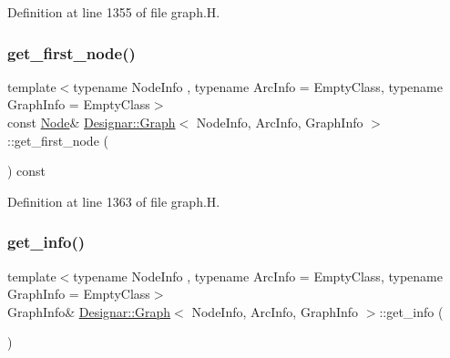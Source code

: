 Definition at line 1355 of file graph.\+H.

\mbox{\label{class_designar_1_1_graph_a2c27cdec559e9773deebec6f1af25a99}} 
\subsubsection{\texorpdfstring{get\+\_\+first\+\_\+node()}{get\_first\_node()}\hspace{0.1cm}{\footnotesize\ttfamily [2/2]}}
{\footnotesize\ttfamily template$<$typename Node\+Info , typename Arc\+Info  = Empty\+Class, typename Graph\+Info  = Empty\+Class$>$ \\
const \hyperlink{class_designar_1_1_graph_a5dfc7dba9d092ac489c72e40390c37d0}{Node}\& \hyperlink{class_designar_1_1_graph}{Designar\+::\+Graph}$<$ Node\+Info, Arc\+Info, Graph\+Info $>$\+::get\+\_\+first\+\_\+node (\begin{DoxyParamCaption}{ }\end{DoxyParamCaption}) const\hspace{0.3cm}{\ttfamily [inline]}}



Definition at line 1363 of file graph.\+H.

\mbox{\label{class_designar_1_1_graph_a5b84c02e86c7887333df2d8934079678}} 
\subsubsection{\texorpdfstring{get\+\_\+info()}{get\_info()}\hspace{0.1cm}{\footnotesize\ttfamily [1/2]}}
{\footnotesize\ttfamily template$<$typename Node\+Info , typename Arc\+Info  = Empty\+Class, typename Graph\+Info  = Empty\+Class$>$ \\
Graph\+Info\& \hyperlink{class_designar_1_1_graph}{Designar\+::\+Graph}$<$ Node\+Info, Arc\+Info, Graph\+Info $>$\+::get\+\_\+info (\begin{DoxyParamCaption}{ }\end{DoxyParamCaption})\hspace{0.3cm}{\ttfamily [inline]}}



